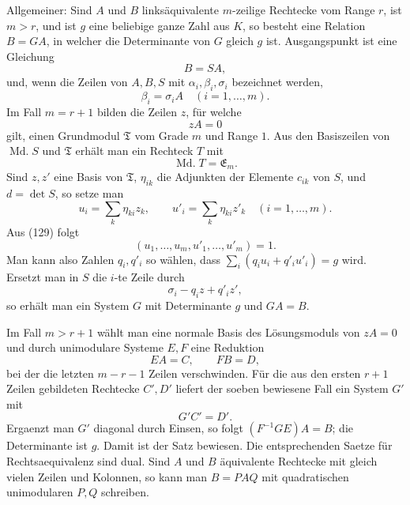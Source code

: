 \documentclass[11pt]{article}
\newcommand{\Md}{\operatorname{Md.}}
\begin{document}
Allgemeiner: Sind $A$ und $B$ linksäquivalente $m$-zeilige Rechtecke vom Range $r$, ist $m>r$, und ist $g$ eine beliebige ganze Zahl aus $K$, so besteht eine Relation $B=GA$, in welcher die Determinante von $G$ gleich $g$ ist. Ausgangspunkt ist eine Gleichung
\begin{equation}
  B=SA,
\tag{126}
\end{equation}
und, wenn die Zeilen von $A,B,S$ mit $\alpha_i,\beta_i,\sigma_i$ bezeichnet werden,
\begin{equation}
  \beta_i=\sigma_iA\quad (i=1,
\ldots,m).
\tag{127}
\end{equation}
Im Fall $m=r+1$ bilden die Zeilen $z$, für welche
\begin{equation}
  zA=0
\tag{128}
\end{equation}
gilt, einen Grundmodul $\mathfrak T$ vom Grade $m$ und Range $1$. Aus den Basiszeilen von $\Md S$ und $\mathfrak T$ erhält man ein Rechteck $T$ mit
\begin{equation}
  \Md T=\mathfrak E_m.
\tag{129}
\end{equation}
Sind $z,z'$ eine Basis von $\mathfrak T$, $\eta_{ik}$ die Adjunkten der Elemente $c_{ik}$ von $S$, und $d=\det S$, so setze man
\begin{equation}
  u_i=\sum_k\eta_{ki}z_k,
  \qquad
  u'_i=\sum_k\eta_{ki}z'_k
  \quad (i=1,
\ldots,m).
\tag{130}
\end{equation}
Aus (129) folgt
\begin{equation}
  (u_1,
\ldots,u_m,u'_1,
\ldots,u'_m)=1.
\tag{131}
\end{equation}
Man kann also Zahlen $q_i,q'_i$ so wählen, dass $\sum_i(q_i u_i+q'_i u'_i)=g$ wird. Ersetzt man in $S$ die $i$-te Zeile durch
\[
  \sigma_i-q_i z+q'_i z',
\]
so erhält man ein System $G$ mit Determinante $g$ und $GA=B$.

Im Fall $m>r+1$ wählt man eine normale Basis des Lösungsmoduls von $zA=0$ und durch unimodulare Systeme $E,F$ eine Reduktion
\begin{equation}
  EA=C,
  \qquad
  FB=D,
\tag{132}
\end{equation}
bei der die letzten $m-r-1$ Zeilen verschwinden. Für die aus den ersten $r+1$ Zeilen gebildeten Rechtecke $C',D'$ liefert der soeben bewiesene Fall ein System $G'$ mit
\begin{equation}
  G'C'=D'.
\tag{133}
\end{equation}
Ergaenzt man $G'$ diagonal durch Einsen, so folgt $(F^{-1}GE)A=B$; die Determinante ist $g$. Damit ist der Satz bewiesen. Die entsprechenden Saetze für Rechtsaequivalenz sind dual. Sind $A$ und $B$ äquivalente Rechtecke mit gleich vielen Zeilen und Kolonnen, so kann man $B=PAQ$ mit quadratischen unimodularen $P,Q$ schreiben.
\end{document}

